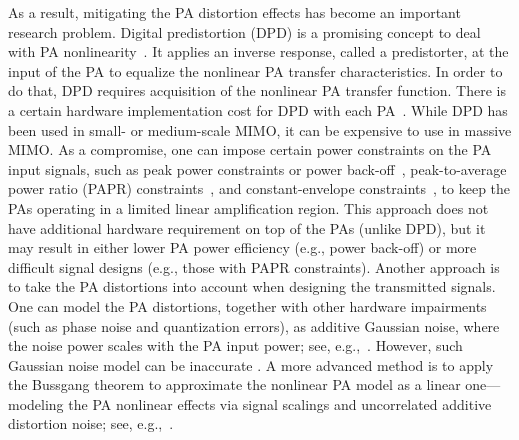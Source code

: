 \documentclass[10pt,twocolumn,twoside]{IEEEtran}
\def\blue{\color{blue}}
\begin{document}
As a result, mitigating the PA distortion effects has become an important research problem.
Digital predistortion (DPD) is a promising concept to deal with PA nonlinearity~\cite{ghannouchi2009behavioral,guan2014green,katz2016evolution}. It applies an inverse response, called a predistorter, at the input of the PA to equalize the nonlinear PA transfer characteristics.
In order to do that, DPD requires acquisition of the nonlinear PA transfer function.
There is a certain hardware implementation cost for DPD with each PA~\cite{wood2017system}.
While DPD has been used in small- or medium-scale MIMO, it can be expensive to use in massive MIMO.
As a compromise, one can impose certain power constraints on the PA input signals, such as peak power constraints or
power back-off~\cite{schenk2008rf,jedda2017precoding,spano2017symbol},
peak-to-average power ratio (PAPR) constraints~\cite{studer2013aware,bao2016efficient,yao2018semidefinite,qin2021low,spano2017symbol},
and constant-envelope constraints~\cite{mohammed2013per,pan2014constant,shao2019framework,domouchtsidis2020constant}, to keep the PAs operating in a limited linear amplification region.
This approach does not have additional hardware requirement on top of the PAs (unlike DPD),
but it may result in either lower PA power efficiency (e.g., power back-off) or more difficult signal designs (e.g., those with PAPR constraints).
Another approach is to
take the PA distortions into account when designing the transmitted signals.
One can model the PA distortions, together with other hardware impairments (such as phase noise and quantization errors), as additive Gaussian noise, where the noise power scales with the PA input power; see, e.g.,~\cite{bjornson2012optimal,brandt2014weighted,zarei2017multi}.
However,  such Gaussian noise model
can be inaccurate \cite{larsson2018out,anttila2019antenna}.
A more advanced method is to apply the Bussgang theorem to approximate the nonlinear PA model as a linear one---modeling the PA nonlinear effects via signal scalings and uncorrelated additive distortion noise;
see, e.g.,~\cite{aghdam2020distortion,jee2020precoding,jee2021joint}.
\end{document}
